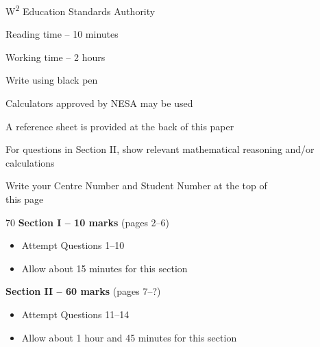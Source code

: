 \begin{coverpage}
	{\fontsize{13pt}{13pt}\selectfont W\textsuperscript{2} Education Standards Authority}
	\vspace{2.4cm}



	\vspace{1cm}

		\begin{generalinstructions}
			\item Reading time -- 10 minutes
			\item Working time -- 2 hours
			\item Write using black pen
			\item Calculators approved by NESA may be used
			\item A reference sheet is provided at the back of this paper
			\item For questions in Section II, show relevant mathematical reasoning and/or calculations
			\item Write your Centre Number and Student Number at the top of \\ this page
		\end{generalinstructions}

	\vspace{1cm}

	\begin{sectionlist}{70}
		\textbf{Section I -- 10 marks} (pages 2--6)
		\begin{itemize}
			\item Attempt Questions 1--10
			\item Allow about 15 minutes for this section
		\end{itemize}
		\textbf{Section II -- 60 marks} (pages 7--?)
		\begin{itemize}
			\item Attempt Questions 11--14
			\item Allow about 1 hour and 45 minutes for this section
		\end{itemize}
	\end{sectionlist}
\end{coverpage}
